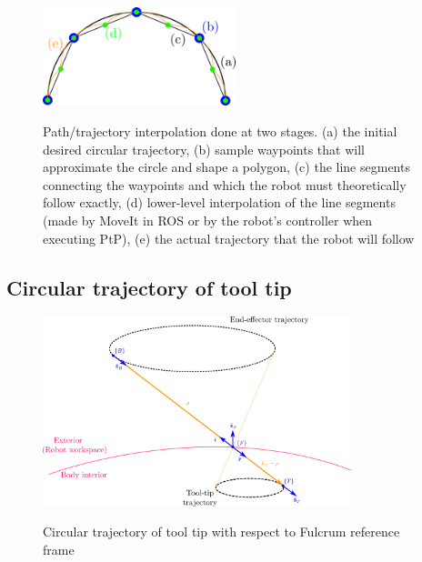 \begin{center}
\begin{figure}[!htb]
\centering
\includegraphics[width=0.5\textwidth]{images/interpolation-accuracy.png}\\
\caption{Path/trajectory interpolation done at two stages. (a) the initial desired circular trajectory, (b) sample waypoints that will approximate the circle and shape a polygon, (c) the line segments connecting the 
waypoints and which the robot must theoretically follow exactly, (d) lower-level interpolation of the line segments (made by MoveIt in ROS or by the robot's controller when executing PtP), (e) the actual trajectory that 
the robot will follow}
\label{interpolation-accuracy}
\end{figure}
\end{center}


\subsection{Circular trajectory of tool tip}

\begin{center}
\begin{figure}[!htb]
\centering
\includegraphics[width=0.8\textwidth]{images/circular-trajectory-wrt-fulcrum.png}\\
\caption{Circular trajectory of tool tip with respect to Fulcrum reference frame}
\end{figure}
\end{center}

